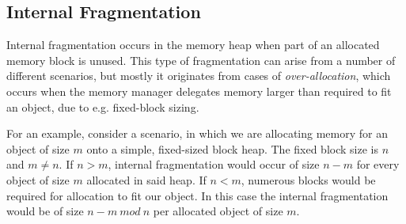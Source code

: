 \subsection{Internal Fragmentation}
\label{subsec:internal-fragmentation}
Internal fragmentation occurs in the memory heap when part of an allocated memory block is unused. This type of fragmentation can arise from a number of different scenarios, but mostly it originates from cases of \textit{over-allocation}, which occurs when the memory manager delegates memory larger than required to fit an object, due to e.g. fixed-block sizing. 

For an example, consider a scenario, in which we are allocating memory for an object of size $m$ onto a simple, fixed-sized block heap. The fixed block size is $n$ and $m \neq n$. If $n > m$, internal fragmentation would occur of size $n-m$ for every object of size $m$ allocated in said heap. If $n < m$, numerous blocks would be required for allocation to fit our object. In this case the internal fragmentation would be of size $n - m\ mod\ n$ per allocated object of size $m$.

